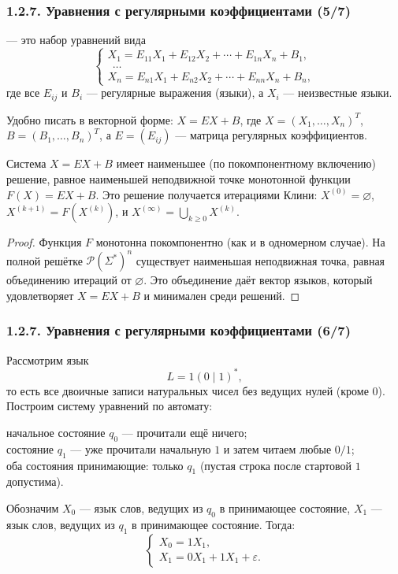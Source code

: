 \begin{frame}
\frametitle{1.2.7. Уравнения с регулярными коэффициентами (5/7)}
--- это набор уравнений вида
\[
\begin{cases}
X_1 = E_{11}X_1 + E_{12}X_2 + \cdots + E_{1n}X_n + B_1,\\
\ \ \dots\\
X_n = E_{n1}X_1 + E_{n2}X_2 + \cdots + E_{nn}X_n + B_n,
\end{cases}
\]
где все $E_{ij}$ и $B_i$ --- регулярные выражения (языки), а $X_i$ --- неизвестные языки.


\begin{remark}
Удобно писать в векторной форме: $X=EX+B$, где
$X=(X_1,\dots,X_n)^T$, $B=(B_1,\dots,B_n)^T$,
а $E=(E_{ij})$ --- матрица регулярных коэффициентов.
\end{remark}

\begin{theorem}
Система $X=EX+B$ имеет наименьшее (по покомпонентному включению) решение,
равное наименьшей неподвижной точке монотонной функции $F(X)=EX+B$.
Это решение получается итерациями Клини:
$X^{(0)}=\varnothing$, $X^{(k+1)}=F(X^{(k)})$, и
$X^{(\infty)}=\bigcup_{k\ge 0}X^{(k)}$.
\end{theorem}

\begin{proof}
Функция $F$ монотонна покомпонентно (как и в одномерном случае).
На полной решётке $\mathcal{P}(\Sigma^*)^n$ существует наименьшая неподвижная точка,
равная объединению итераций от $\varnothing$.
Это объединение даёт вектор языков, который удовлетворяет $X=EX+B$ и минимален среди решений.
\end{proof}
\end{frame}

\begin{frame}
\frametitle{1.2.7. Уравнения с регулярными коэффициентами (6/7)}
\begin{example}
Рассмотрим язык
\[
L=1(0\mid 1)^*,
\]
то есть все двоичные записи натуральных чисел без ведущих нулей (кроме $0$).
Построим систему уравнений по автомату:

\smallskip

начальное состояние $q_0$ --- прочитали ещё ничего;\\
состояние $q_1$ --- уже прочитали начальную $1$ и затем читаем любые $0/1$; \\
оба состояния принимающие: только $q_1$ (пустая строка после стартовой $1$ допустима).


Обозначим $X_0$ --- язык слов, ведущих из $q_0$ в принимающее состояние,
$X_1$ --- язык слов, ведущих из $q_1$ в принимающее состояние.
Тогда:
\[
\begin{cases}
X_0 = 1X_1,\\
X_1 = 0X_1 + 1X_1 + \varepsilon.
\end{cases}
\]
\end{example}
\end{frame}


